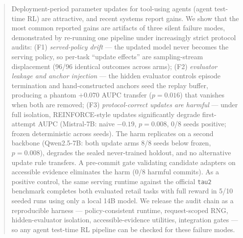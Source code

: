 \begin{abstract}
Deployment-period parameter updates for tool-using agents (agent
test-time RL) are attractive, and recent systems report gains. We show
that the most common reported gains are artifacts of three silent
failure modes, demonstrated by re-running one pipeline under
increasingly strict protocol audits: (F1) \emph{served-policy drift} ---
the updated model never becomes the serving policy, so per-task
``update effects'' are sampling-stream displacement (96/96 identical
outcomes across arms); (F2) \emph{evaluator leakage and anchor
injection} --- the hidden evaluator controls episode termination and
hand-constructed anchors seed the replay buffer, producing a phantom
$+0.070$ AUPC transfer ($p{=}0.016$) that vanishes when both are
removed; (F3) \emph{protocol-correct updates are harmful} --- under
full isolation, REINFORCE-style updates significantly degrade
first-attempt AUPC (Mistral-7B: naive $-0.19$, $p{=}0.008$, 0/8 seeds
positive; frozen deterministic across seeds). The harm replicates on a
second backbone (Qwen2.5-7B: both update arms 8/8 seeds below frozen,
$p{=}0.008$), degrades the sealed never-trained holdout, and no
alternative update rule transfers. A pre-commit gate validating
candidate adapters on accessible evidence eliminates the harm (0/8
harmful commits). As a positive control, the same serving runtime
against the official \texttt{tau2} benchmark completes both evaluated
retail tasks with full reward in 5/10 seeded runs using only a local
14B model. We release the audit chain as a reproducible harness ---
policy-consistent runtime, request-scoped RNG, hidden-evaluator
isolation, accessible-evidence utilities, integration gates --- so any
agent test-time RL pipeline can be checked for these failure modes.
\end{abstract}
